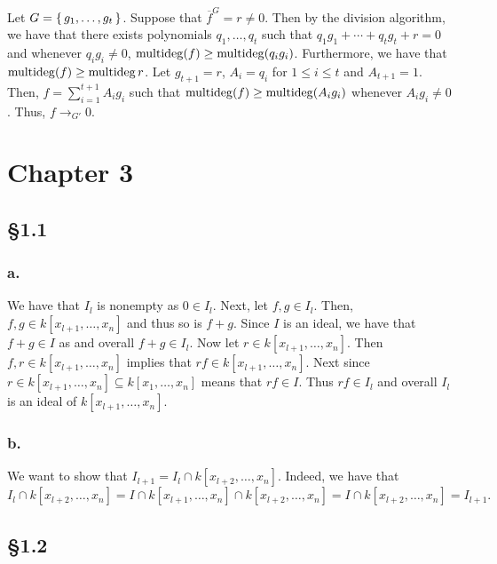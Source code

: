 \documentclass[letterpaper]{article}
\begin{document}
Let $G = \set{g_{1}, \ldots, g_{t}}$.
Suppose that $\overline{f}^{G} = r \neq 0$.
Then by the division algorithm, we have that there exists polynomials $q_{1}, \ldots, q_{t}$ such that $q_{1}g_{1} + \cdots + q_{t}g_{t} + r = 0$ and whenever $q_{i}g_{i} \neq 0$, $\operatorname{multideg}(f) \geq \operatorname{multideg}(q_{i}g_{i})$.
Furthermore, we have that $\operatorname{multideg}(f) \geq \operatorname{multideg} r$.
Let $g_{t + 1} = r$, $A_{i} = q_{i}$ for $1 \leq i \leq t$ and $A_{t + 1} = 1$.
Then, $f = \sum_{i = 1}^{t + 1} A_{i}g_{i}$ such that $\operatorname{multideg}(f) \geq \operatorname{multideg}(A_{i}g_{i})$ whenever $A_{i}g_{i} \neq 0$.
Thus, $f \to _{G'} 0$.

\clearpage

\section*{Chapter 3}

\subsection*{\S 1.1}

\subsubsection*{a.}

We have that $I_{l}$ is nonempty as $0 \in I_{l}$.
Next, let $f, g \in I_{l}$.
Then, $f, g \in k[x_{l + 1}, \ldots, x_{n}]$ and thus so is $f + g$.
Since $I$ is an ideal, we have that $f + g \in I$ as and overall $f + g \in I_{l}$.
Now let $r \in k[x_{l + 1}, \ldots, x_{n}]$.
Then $f, r \in k[x_{l + 1}, \ldots, x_{n}]$ implies that $rf \in k[x_{l + 1}, \ldots, x_{n}]$.
Next since $r \in k[x_{l + 1}, \ldots, x_{n}] \subseteq k[x_{1}, \ldots, x_{n}]$ means that $rf \in I$.
Thus $rf \in I_{l}$ and overall $I_{l}$ is an ideal of $k[x_{l + 1}, \ldots, x_{n}]$.

\subsubsection*{b.}

We want to show that $I_{l + 1} = I_{l} \cap k[x_{l + 2}, \ldots, x_{n}]$.
Indeed, we have that
\[
  I_{l} \cap k[x_{l + 2}, \ldots, x_{n}] = I \cap k[x_{l + 1}, \ldots, x_{n}] \cap k[x_{l + 2}, \ldots, x_{n}] = I \cap k[x_{l + 2}, \ldots, x_{n}] = I_{l + 1}.
\]

\subsection*{\S 1.2}
\end{document}
